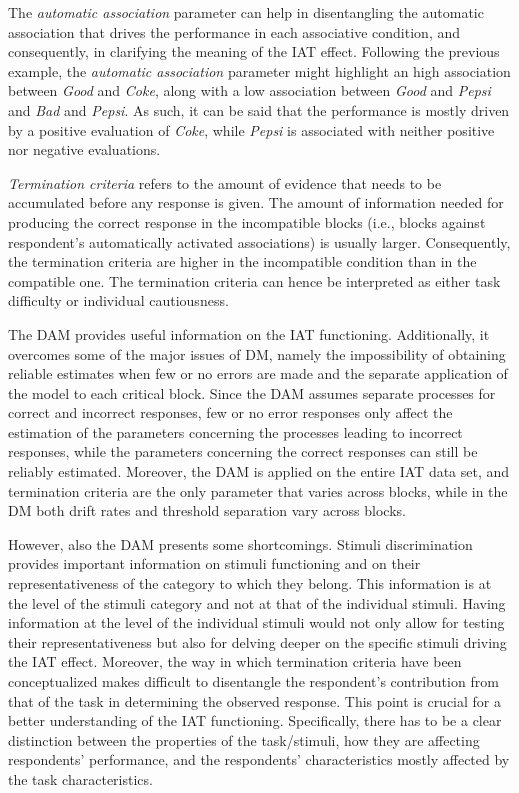 \documentclass[12pt]{book}
\begin{document}
The \emph{automatic association} parameter can help in disentangling the automatic association that drives the performance in each associative condition, and consequently, in clarifying the meaning of the IAT effect. 
Following the previous example, the \emph{automatic association} parameter might highlight an high association between \emph{Good} and \emph{Coke}, along with a low association between \emph{Good} and \emph{Pepsi} and \emph{Bad} and \emph{Pepsi}. As such, it can be said that the performance is mostly driven by a positive evaluation of \emph{Coke}, while \emph{Pepsi} is associated with neither positive nor negative evaluations.

 \emph{Termination criteria} refers to the amount of evidence that needs to be accumulated before any response is given. The amount of information needed for producing the correct response in the incompatible blocks (i.e., blocks against respondent's automatically activated associations) is usually larger. Consequently, the termination criteria are higher in the incompatible condition than in the compatible one. The termination criteria can hence be interpreted as either task difficulty or individual cautiousness. 

The DAM provides useful information on the IAT functioning. Additionally, it overcomes some of the major issues of DM, namely the impossibility of obtaining reliable estimates when few or no errors are made and the separate application of the model to each critical block. 
Since the DAM assumes separate processes for correct and incorrect responses, few or no error responses only affect the estimation of the parameters concerning the processes leading to incorrect responses, while the parameters concerning the correct responses can still be reliably estimated. 
Moreover, the DAM is applied on the entire IAT data set, and termination criteria are the only parameter that varies across blocks, while in the DM both drift rates and threshold separation vary across blocks. 

However, also the DAM presents some shortcomings.
Stimuli discrimination provides important information on stimuli functioning and on their representativeness of the category to which they belong. This information is at the level of the stimuli category and not at that of the individual stimuli. Having  information at the level of the individual stimuli would not only allow for testing their representativeness but also for delving deeper on the specific stimuli driving the IAT effect. 
Moreover, the way in which termination criteria have been conceptualized makes difficult to disentangle the respondent's contribution from that of the task in determining the observed response. This point is crucial for a better understanding of the IAT functioning. Specifically, there has to be a clear distinction between the properties of the task/stimuli, how they are affecting respondents' performance, and the respondents' characteristics mostly affected by the task characteristics. 
 
\end{document}
